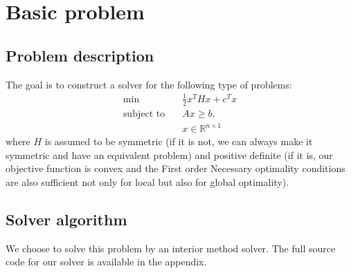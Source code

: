 \documentclass{article}
\begin{document}





\newpage

\section{Basic problem}
\subsection{Problem description}
The goal is to construct a solver for the following type of problems:
\begin{equation} 
\begin{aligned}
\textrm{min} \quad        & \frac{1}{2} x^T H x + c^T x \\
\textrm{subject to} \quad & A x \geq b,  \\
                          & x \in \mathbb{R}^{n \times 1}
\end{aligned}
\label{prob:qp}
\end{equation}
where $H$ is assumed to be symmetric (if it is not, we can always make it symmetric and have an equivalent problem) and positive definite (if it is, our objective function is convex and the First order Necessary optimality conditions are also sufficient not only for local but also for global optimality).

\subsection{Solver algorithm}
We choose to solve this problem by an interior method solver. The full source code for our solver is available in the appendix.
\end{document}
